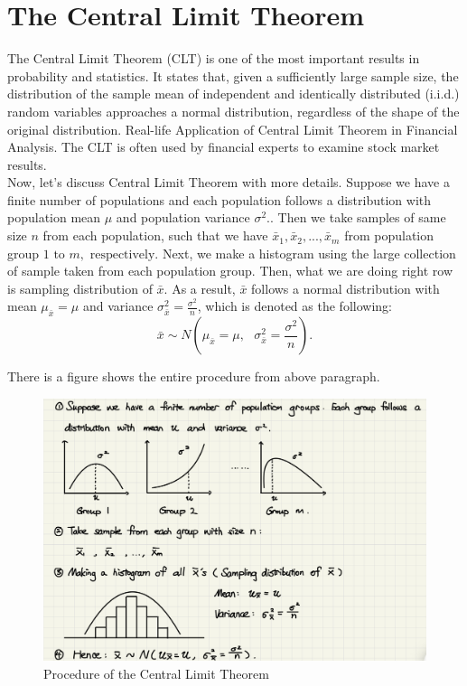 \chapter{The Central Limit Theorem}

The Central Limit Theorem (CLT) is one of the most important results in probability and statistics. It states that, given a sufficiently large sample size, the distribution of the sample mean of independent and identically distributed (i.i.d.) random variables approaches a normal distribution, regardless of the shape of the original distribution. Real-life Application of Central Limit Theorem in Financial Analysis. The CLT is often used by financial experts to examine stock market results.\\

\noindent
Now, let's discuss Central Limit Theorem with more details. Suppose we have a finite number of populations and each population follows a distribution with population mean $\mu$ and population variance $\sigma^2.$. Then we take samples of same size $n$ from each population, such that we have $\bar{x}_1, \bar{x}_2, ..., \bar{x}_m$ from population group $1 \text{ to } m, \text{ respectively.}$ Next, we make a histogram using the large collection of sample taken from each population group. Then, what we are doing right row is sampling distribution of $\bar{x}$. As a result, $\bar{x}$ follows a normal distribution with mean $\mu_{\bar{x}} = \mu$ and variance $\sigma_{\bar{x}}^{2} = \frac{\sigma^2}{n}$, which is denoted as the following: \[ \bar{x} \sim N(\mu_{\bar{x}} = \mu, \text{ } \sigma_{\bar{x}}^{2} = \frac{\sigma^2}{n}).\]

\noindent
There is a figure shows the entire procedure from above paragraph.

\begin{figure}[H]
 \centering
 \includegraphics[scale=0.15]{Section3/Img3/CLT.jpg}
 \caption{Procedure of the Central Limit Theorem}
\end{figure}

